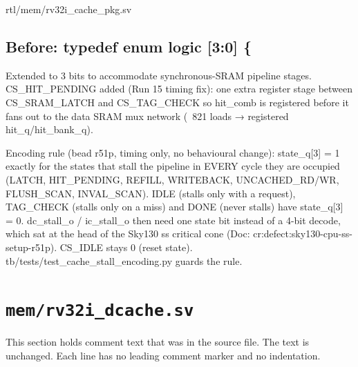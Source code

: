 \begin{relocated}{rtl/mem/rv32i_cache_pkg.sv}

\subsection*{Before: typedef enum logic [3:0] \{}

\begin{textblock}
Extended to 3 bits to accommodate synchronous-SRAM pipeline stages.
CS_HIT_PENDING added (Run 15 timing fix): one extra register stage between
CS_SRAM_LATCH and CS_TAG_CHECK so hit_comb is registered before it fans
out to the data SRAM mux network (~821 loads → registered hit_q/hit_bank_q).

Encoding rule (bead r51p, timing only, no behavioural change): state_q[3] = 1
exactly for the states that stall the pipeline in EVERY cycle they are occupied
(LATCH, HIT_PENDING, REFILL, WRITEBACK, UNCACHED_RD/WR, FLUSH_SCAN, INVAL_SCAN).
IDLE (stalls only with a request), TAG_CHECK (stalls only on a miss) and DONE
(never stalls) have state_q[3] = 0. dc_stall_o / ic_stall_o then need one state
bit instead of a 4-bit decode, which sat at the head of the Sky130 ss critical
cone (Doc: cr:defect:sky130-cpu-ss-setup-r51p). CS_IDLE stays 0 (reset state).
tb/tests/test_cache_stall_encoding.py guards the rule.
\end{textblock}

\end{relocated}

\section{\texttt{mem/rv32i\_dcache.sv}}\label{tm:mod:rv32i-dcache}

This section holds comment text that was in the source file. The text is unchanged. Each line has no leading comment marker and no indentation.

